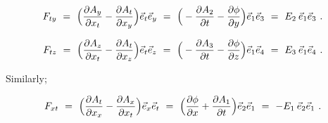 \documentclass{article}
\begin{document}
\begin{equation} \label{eb-eq-1002-23}
F_{t y} \hspace{0.125cm} = \hspace{0.125cm}  \Big( \frac{\partial{A_{y}}}{\partial{x_{t}}} - \frac{\partial{A_{t}}}{\partial{x_{y}}} \Big) \vec{e}_{t} \vec{e}_{y} \hspace{0.125cm} = \hspace{0.125cm} \Big( - \frac{\partial{A_{2}}}{\partial{t}} - \frac{\partial{\phi}}{\partial{y}} \Big) \vec{e}_{1} \vec{e}_{3} \hspace{0.125cm} = \hspace{0.125cm} E_2 \hspace{0.075cm} \vec{e}_{1} \vec{e}_{3} \hspace{0.125cm} .
\end{equation}

\begin{equation} \label{eb-eq-1002-24}
F_{t z} \hspace{0.125cm} = \hspace{0.125cm}  \Big( \frac{\partial{A_{z}}}{\partial{x_{t}}} - \frac{\partial{A_{t}}}{\partial{x_{z}}} \Big) \vec{e}_{t} \vec{e}_{z} \hspace{0.125cm} = \hspace{0.125cm} \Big( - \frac{\partial{A_{3}}}{\partial{t}} - \frac{\partial{\phi}}{\partial{z}} \Big) \vec{e}_{1} \vec{e}_{4} \hspace{0.125cm} = \hspace{0.125cm} E_3 \hspace{0.075cm} \vec{e}_{1} \vec{e}_{4} \hspace{0.125cm} .
\end{equation}

Similarly;

\begin{equation} \label{eb-eq-1002-25}
F_{x t} \hspace{0.125cm} = \hspace{0.125cm}  \Big( \frac{\partial{A_{t}}}{\partial{x_{x}}} - \frac{\partial{A_{x}}}{\partial{x_{t}}} \Big) \vec{e}_{x} \vec{e}_{t} \hspace{0.125cm} = \hspace{0.125cm} \Big(  \frac{\partial{\phi}}{\partial{x}} + \frac{\partial{A_{1}}}{\partial{t}} \Big) \vec{e}_{2} \vec{e}_{1} \hspace{0.125cm} = \hspace{0.125cm} - E_1 \hspace{0.075cm} \vec{e}_{2} \vec{e}_{1} \hspace{0.125cm} .
\end{equation}
\end{document}

